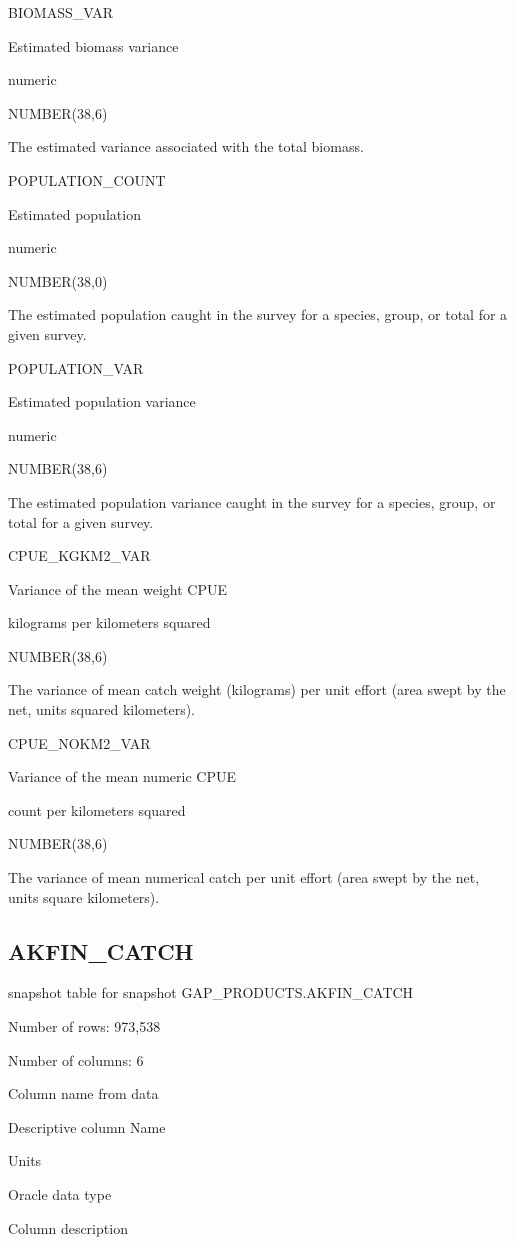\documentclass[
  letterpaper,
  oneside,
  open=any]{scrbook}
\begin{document}
BIOMASS\_VAR

Estimated biomass variance

numeric

NUMBER(38,6)

The estimated variance associated with the total biomass.

POPULATION\_COUNT

Estimated population

numeric

NUMBER(38,0)

The estimated population caught in the survey for a species, group, or
total for a given survey.

POPULATION\_VAR

Estimated population variance

numeric

NUMBER(38,6)

The estimated population variance caught in the survey for a species,
group, or total for a given survey.

CPUE\_KGKM2\_VAR

Variance of the mean weight CPUE

kilograms per kilometers squared

NUMBER(38,6)

The variance of mean catch weight (kilograms) per unit effort (area
swept by the net, units squared kilometers).

CPUE\_NOKM2\_VAR

Variance of the mean numeric CPUE

count per kilometers squared

NUMBER(38,6)

The variance of mean numerical catch per unit effort (area swept by the
net, units square kilometers).

\subsection{AKFIN\_CATCH}\label{akfin_catch}

snapshot table for snapshot GAP\_PRODUCTS.AKFIN\_CATCH

Number of rows: 973,538

Number of columns: 6

Column name from data

Descriptive column Name

Units

Oracle data type

Column description
\end{document}
